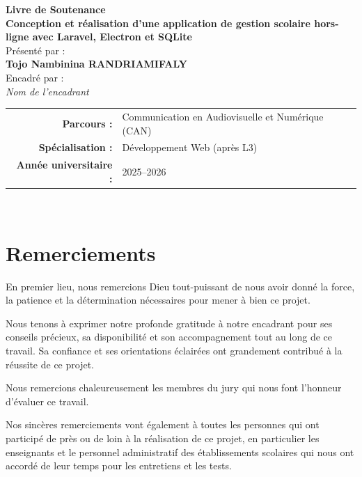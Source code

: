 \documentclass[12pt,a4paper,twoside]{report}
\begin{document}
\begin{titlepage}
    \begin{center}
        \vspace*{2cm}
        {\Huge \textbf{Livre de Soutenance}}\\[1.5cm]
        {\Large \textbf{Conception et réalisation d'une application de gestion scolaire hors-ligne avec Laravel, Electron et SQLite}}\\[2cm]
        {\large Présenté par :}\\[0.3cm]
        {\Large \textbf{Tojo Nambinina RANDRIAMIFALY}}\\[1.5cm]
        {\large Encadré par :}\\[0.3cm]
        {\Large \textit{Nom de l'encadrant}}\\[2cm]
        \begin{tabular}{rl}
            \textbf{Parcours :} & Communication en Audiovisuelle et Numérique (CAN)\\
            \textbf{Spécialisation :} & Développement Web (après L3)\\
            \textbf{Année universitaire :} & 2025--2026
        \end{tabular}\\[2cm]
        \vfill
    \end{center}
\end{titlepage}

\chapter*{Remerciements}

En premier lieu, nous remercions Dieu tout-puissant de nous avoir donné la force, la patience et la détermination nécessaires pour mener à bien ce projet.

Nous tenons à exprimer notre profonde gratitude à notre encadrant pour ses conseils précieux, sa disponibilité et son accompagnement tout au long de ce travail. Sa confiance et ses orientations éclairées ont grandement contribué à la réussite de ce projet.

Nous remercions chaleureusement les membres du jury qui nous font l'honneur d'évaluer ce travail.

Nos sincères remerciements vont également à toutes les personnes qui ont participé de près ou de loin à la réalisation de ce projet, en particulier les enseignants et le personnel administratif des établissements scolaires qui nous ont accordé de leur temps pour les entretiens et les tests.
\end{document}
